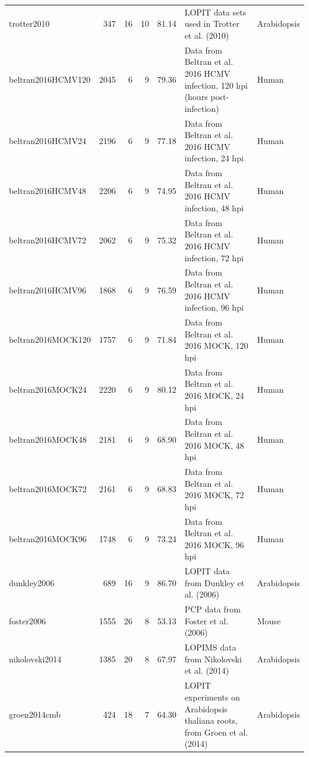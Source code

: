 \documentclass[12pt]{article}\usepackage[]{graphicx}\usepackage[]{color}
\begin{document}
\begin{footnotesize}
\begin{landscape}
\begin{longtable}{lrrrrll}
  trotter2010 & 347 &  16 &  10 & 81.14 & LOPIT data sets used in Trotter et al. (2010) \citep{Trotter:2010} & Arabidopsis \\ 
  beltran2016HCMV120 & 2045 &   6 &   9 & 79.36 & Data from Beltran et al. 2016 \citep{JeanBeltran:2016} HCMV infection, 120 hpi (hours post-infection) & Human \\ 
  beltran2016HCMV24 & 2196 &   6 &   9 & 77.18 & Data from Beltran et al. 2016 \citep{JeanBeltran:2016} HCMV infection, 24 hpi & Human \\ 
  beltran2016HCMV48 & 2206 &   6 &   9 & 74.95 & Data from Beltran et al. 2016 \citep{JeanBeltran:2016} HCMV infection, 48 hpi & Human \\ 
  beltran2016HCMV72 & 2062 &   6 &   9 & 75.32 & Data from Beltran et al. 2016 \citep{JeanBeltran:2016} HCMV infection, 72 hpi & Human \\ 
  beltran2016HCMV96 & 1868 &   6 &   9 & 76.59 & Data from Beltran et al. 2016 \citep{JeanBeltran:2016} HCMV infection, 96 hpi & Human \\ 
  beltran2016MOCK120 & 1757 &   6 &   9 & 71.84 & Data from Beltran et al. 2016 \citep{JeanBeltran:2016} MOCK, 120 hpi & Human \\ 
  beltran2016MOCK24 & 2220 &   6 &   9 & 80.12 & Data from Beltran et al. 2016 \citep{JeanBeltran:2016} MOCK, 24 hpi & Human \\ 
  beltran2016MOCK48 & 2181 &   6 &   9 & 68.90 & Data from Beltran et al. 2016 \citep{JeanBeltran:2016} MOCK, 48 hpi & Human \\ 
  beltran2016MOCK72 & 2161 &   6 &   9 & 68.83 & Data from Beltran et al. 2016 \citep{JeanBeltran:2016} MOCK, 72 hpi & Human \\ 
  beltran2016MOCK96 & 1748 &   6 &   9 & 73.24 & Data from Beltran et al. 2016 \citep{JeanBeltran:2016} MOCK, 96 hpi & Human \\ 
  dunkley2006 & 689 &  16 &   9 & 86.70 & LOPIT data from Dunkley et al. (2006) \citep{Dunkley:2006} & Arabidopsis \\ 
  foster2006 & 1555 &  26 &   8 & 53.13 & PCP data from Foster et al. (2006) \citep{Foster:2006} & Mouse \\ 
  nikolovski2014 & 1385 &  20 &   8 & 67.97 & LOPIMS data from Nikolovski et al. (2014) \citep{Nikolovski:2014} & Arabidopsis \\ 
  groen2014cmb & 424 &  18 &   7 & 64.30 & LOPIT experiments on Arabidopsis thaliana roots, from Groen et al. (2014) \citep{Groen:2014} & Arabidopsis \\ 

\end{longtable}
\end{landscape}
\end{footnotesize}
\end{document}
